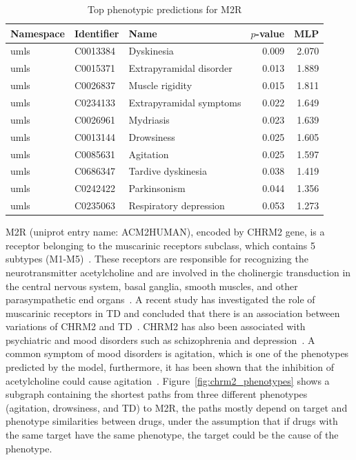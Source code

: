 \begin{table}[h]
    \centering
    \begin{tabular}{ |l|l|l|r|r| }
        \hline
        \textbf{Namespace} & \textbf{Identifier} & \textbf{Name} & \textbf{$p$-value} & \textbf{MLP} \\
        \hline
        umls & C0013384 & Dyskinesia & 0.009 & 2.070 \\
        \hline
        umls & C0015371 & Extrapyramidal disorder & 0.013 & 1.889 \\
        \hline
        umls & C0026837 & Muscle rigidity & 0.015 & 1.811 \\
        \hline
        umls & C0234133 & Extrapyramidal symptoms & 0.022 & 1.649 \\
        \hline
        umls & C0026961 & Mydriasis & 0.023 & 1.639 \\
        \hline
        umls & C0013144 & Drowsiness & 0.025 & 1.605 \\
        \hline
        umls & C0085631 & Agitation & 0.025 & 1.597 \\
        \hline
        umls & C0686347 & Tardive dyskinesia & 0.038 & 1.419 \\
        \hline
        umls & C0242422 & Parkinsonism & 0.044 & 1.356 \\
        \hline
        umls & C0235063 & Respiratory depression & 0.053 & 1.273 \\
        \hline
    \end{tabular}
    \caption{Top phenotypic predictions for M2R}
    \label{tab:target_phenotype}
\end{table}

M2R (uniprot entry name: ACM2\textunderscore HUMAN), encoded by CHRM2 gene, is a receptor belonging to the muscarinic receptors subclass, which contains 5 subtypes (M1-M5)~\cite{kleinz_chapter_2008}.
These receptors are responsible for recognizing the neurotransmitter acetylcholine and are involved in the cholinergic transduction in the central nervous system, basal ganglia, smooth muscles, and other parasympathetic end organs~\cite{aronstam_muscarinic_2009}.
A recent study has investigated the role of muscarinic receptors in \ac{TD} and concluded that there is an association between variations of CHRM2 and \ac{TD}~\cite{boiko_pharmacogenetics_2019}.
CHRM2 has also been associated with psychiatric and mood disorders such as schizophrenia and depression~\cite{drevets_antidepressant_2013, jeon_role_2015, dean_possible_2015}.
A common symptom of mood disorders is agitation, which is one of the phenotypes predicted by the model, furthermore, it has been shown that the inhibition of acetylcholine could cause agitation~\cite{carlson_physiology_2019}.
Figure~\ref{fig:chrm2_phenotypes} shows a subgraph containing the shortest paths from three different phenotypes (agitation, drowsiness, and \ac{TD}) to M2R, the paths mostly depend on target and phenotype similarities between drugs, under the assumption that if drugs with the same target have the same phenotype, the target could be the cause of the phenotype.


